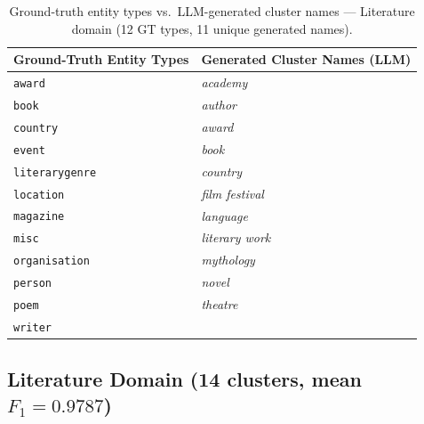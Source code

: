 \documentclass[11pt,a4paper]{article}
\begin{document}
\FloatBarrier

\begin{table}[ht]
\centering
\footnotesize
\caption{Ground-truth entity types vs.\ LLM-generated cluster names --- Literature domain
(12 GT types, 11 unique generated names).}
\label{tab:gt_map_literature}
\setlength{\tabcolsep}{8pt}
\begin{tabular}{l l}
\toprule
\textbf{Ground-Truth Entity Types} & \textbf{Generated Cluster Names (LLM)} \\
\midrule
  \texttt{award} & \textit{academy} \\
  \texttt{book} & \textit{author} \\
  \texttt{country} & \textit{award} \\
  \texttt{event} & \textit{book} \\
  \texttt{literarygenre} & \textit{country} \\
  \texttt{location} & \textit{film festival} \\
  \texttt{magazine} & \textit{language} \\
  \texttt{misc} & \textit{literary work} \\
  \texttt{organisation} & \textit{mythology} \\
  \texttt{person} & \textit{novel} \\
  \texttt{poem} & \textit{theatre} \\
  \texttt{writer} &  \\
\bottomrule
\end{tabular}
\end{table}

\FloatBarrier

\subsection{Literature Domain (14 clusters, mean $F_1 = 0.9787$)}
\end{document}
